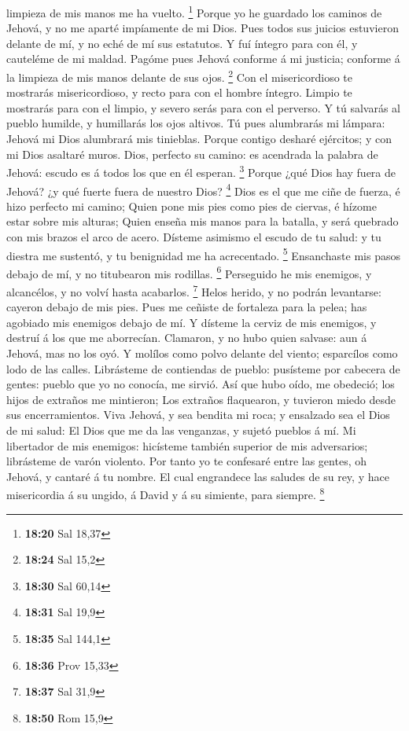 limpieza de mis manos me ha vuelto. \footnote{\textbf{18:20} Sal 18,37}
 Porque yo he guardado los caminos de Jehová, y no me
aparté impíamente de mi Dios.  Pues todos sus juicios
estuvieron delante de mí, y no eché de mí sus estatutos.  Y
fuí íntegro para con él, y cauteléme de mi maldad.  Pagóme
pues Jehová conforme á mi justicia; conforme á la limpieza de mis manos
delante de sus ojos. \footnote{\textbf{18:24} Sal 15,2} 
Con el misericordioso te mostrarás misericordioso, y recto para con el
hombre íntegro.  Limpio te mostrarás para con el limpio, y
severo serás para con el perverso.  Y tú salvarás al pueblo
humilde, y humillarás los ojos altivos.  Tú pues alumbrarás
mi lámpara: Jehová mi Dios alumbrará mis tinieblas.  Porque
contigo desharé ejércitos; y con mi Dios asaltaré muros. 
Dios, perfecto su camino: es acendrada la palabra de Jehová: escudo es á
todos los que en él esperan. \footnote{\textbf{18:30} Sal 60,14}
 Porque ¿qué Dios hay fuera de Jehová? ¿y qué fuerte fuera
de nuestro Dios? \footnote{\textbf{18:31} Sal 19,9}  Dios
es el que me ciñe de fuerza, é hizo perfecto mi camino; 
Quien pone mis pies como pies de ciervas, é hízome estar sobre mis
alturas;  Quien enseña mis manos para la batalla, y será
quebrado con mis brazos el arco de acero.  Dísteme asimismo
el escudo de tu salud: y tu diestra me sustentó, y tu benignidad me ha
acrecentado. \footnote{\textbf{18:35} Sal 144,1} 
Ensanchaste mis pasos debajo de mí, y no titubearon mis rodillas.
\footnote{\textbf{18:36} Prov 15,33}  Perseguido he mis
enemigos, y alcancélos, y no volví hasta acabarlos. \footnote{\textbf{18:37}
  Sal 31,9}  Helos herido, y no podrán levantarse: cayeron
debajo de mis pies.  Pues me ceñiste de fortaleza para la
pelea; has agobiado mis enemigos debajo de mí.  Y dísteme
la cerviz de mis enemigos, y destruí á los que me aborrecían.
 Clamaron, y no hubo quien salvase: aun á Jehová, mas no
los oyó.  Y molílos como polvo delante del viento;
esparcílos como lodo de las calles.  Librásteme de
contiendas de pueblo: pusísteme por cabecera de gentes: pueblo que yo no
conocía, me sirvió.  Así que hubo oído, me obedeció; los
hijos de extraños me mintieron;  Los extraños flaquearon, y
tuvieron miedo desde sus encerramientos.  Viva Jehová, y
sea bendita mi roca; y ensalzado sea el Dios de mi salud: 
El Dios que me da las venganzas, y sujetó pueblos á mí.  Mi
libertador de mis enemigos: hicísteme también superior de mis
adversarios; librásteme de varón violento.  Por tanto yo te
confesaré entre las gentes, oh Jehová, y cantaré á tu nombre.
 El cual engrandece las saludes de su rey, y hace
misericordia á su ungido, á David y á su simiente, para siempre.
\footnote{\textbf{18:50} Rom 15,9}

